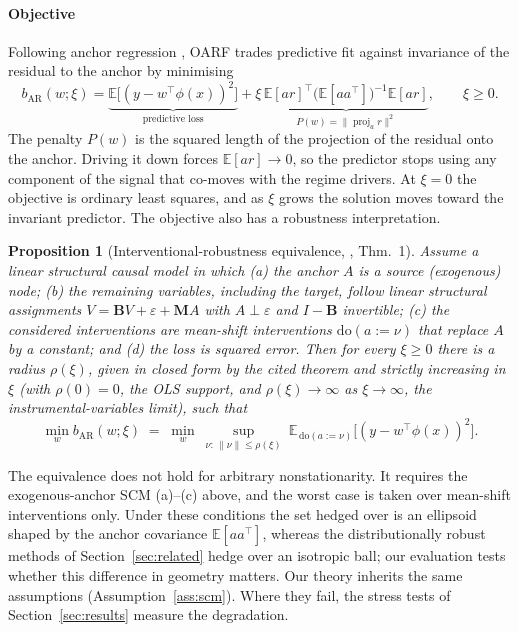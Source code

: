 \documentclass[authoryear,preprint,12pt]{elsarticle}
\theoremstyle{plain}
\newtheorem{proposition}{Proposition}
\theoremstyle{remark}
\newcommand{\E}{\mathbb{E}}
\newcommand{\doop}{\mathrm{do}}
\newcommand{\OARF}{\textsc{OARF}}
\DeclareMathOperator{\proj}{proj}
\begin{document}
\paragraph{Objective}
Following anchor regression \citep{rothenhausler2021anchor}, \OARF{} trades
predictive fit against invariance of the residual to the anchor by minimising
\begin{equation}\label{eq:bar}
b_{\mathrm{AR}}(w;\xi) = \underbrace{\E\!\big[(y-w^\top\phi(x))^2\big]}_{\text{predictive loss}}
 + \xi\,\underbrace{\E[a r]^\top\big(\E[aa^\top]\big)^{-1}\E[a r]}_{P(w)=\|\proj_a r\|^2},
 \qquad \xi\ge 0 .
\end{equation}
The penalty $P(w)$ is the squared length of the projection of the residual onto the
anchor. Driving it down forces $\E[a r]\to 0$, so the predictor stops using any
component of the signal that co-moves with the regime drivers. At $\xi=0$ the
objective is ordinary least squares, and as $\xi$ grows the solution moves toward the
invariant predictor. The objective also has a robustness interpretation.

\begin{proposition}[Interventional-robustness equivalence,
\citealp{rothenhausler2021anchor}, Thm.~1]\label{prop:equiv}
Assume a linear structural causal model in which (a) the anchor $A$ is a
\emph{source} (exogenous) node; (b) the remaining variables, including the target,
follow linear structural assignments $V=\mathbf{B}V+\varepsilon+\mathbf{M}A$ with
$A\perp\varepsilon$ and $I-\mathbf{B}$ invertible; (c) the considered interventions
are mean-shift interventions $\doop(a:=\nu)$ that replace $A$ by a constant; and (d)
the loss is squared error. Then for every $\xi\ge 0$ there is a radius
$\rho(\xi)$, given in closed form by the cited theorem and strictly increasing in
$\xi$ (with $\rho(0)=0$, the OLS support, and $\rho(\xi)\!\to\!\infty$ as
$\xi\!\to\!\infty$, the instrumental-variables limit), such that
\begin{equation}\label{eq:equiv}
\min_w b_{\mathrm{AR}}(w;\xi) \;=\; \min_w\ \sup_{\nu:\,\|\nu\|\le\rho(\xi)}\
 \E_{\,\doop(a:=\nu)}\!\big[(y-w^\top\phi(x))^2\big].
\end{equation}
\end{proposition}
\noindent The equivalence does not hold for arbitrary nonstationarity. It requires the
exogenous-anchor SCM (a)--(c) above, and the worst case is taken over mean-shift
interventions only. Under these conditions the set hedged over is an ellipsoid shaped
by the anchor covariance $\E[aa^\top]$, whereas the distributionally robust methods of
Section~\ref{sec:related} hedge over an isotropic ball; our evaluation tests whether
this difference in geometry matters. Our theory inherits the same assumptions
(Assumption~\ref{ass:scm}). Where they fail, the stress tests of
Section~\ref{sec:results} measure the degradation.
\end{document}
